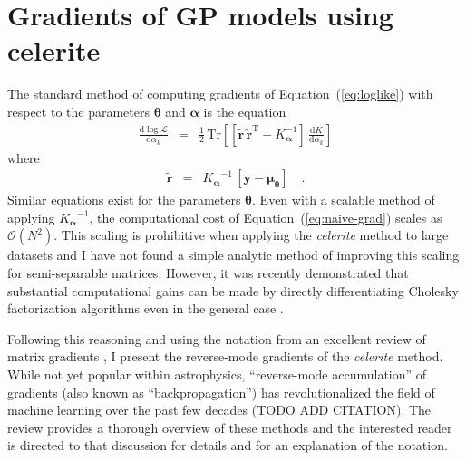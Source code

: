\documentclass[rnaas]{aastex62}
\renewcommand{\eqref}[1]{\ref{eq:#1}}
\newcommand{\Eq}[1]{Equation~(\eqref{#1})}
\newcommand{\eqlabel}[1]{\label{eq:#1}}
\newcommand{\T}{\ensuremath{\mathrm{T}}}
\newcommand{\dd}{\ensuremath{ \mathrm{d}}}
\newcommand{\bvec}[1]{{\ensuremath{\boldsymbol{#1}}}}
\begin{document}
\section{Gradients of GP models using celerite}

The standard method of computing gradients of \Eq{loglike} with respect to the
parameters $\bvec{\theta}$ and $\bvec{\alpha}$ is the equation
\citep{Rasmussen:2006}
\begin{eqnarray}\eqlabel{naive-grad}
\frac{\dd \log \mathcal{L}}{\dd \alpha_k} &=&
    \frac{1}{2}\,\mathrm{Tr}\left[
        \left[
        \bvec{\tilde{r}}\,\bvec{\tilde{r}}^\T - {K_\bvec{\alpha}^{-1}}
        \right]
        \,\frac{\dd K}{\dd \alpha_k}
    \right]
\end{eqnarray}
where
\begin{eqnarray}
    \bvec{\tilde{r}} &=&
        {K_\bvec{\alpha}}^{-1}\,\left[\bvec{y}-\bvec{\mu}_\bvec{\theta}\right]
    \quad.
\end{eqnarray}
Similar equations exist for the parameters $\bvec{\theta}$.
Even with a scalable method of applying ${K_\bvec{\alpha}}^{-1}$, the
computational cost of \Eq{naive-grad} scales as $\mathcal{O}(N^2)$.
This scaling is prohibitive when applying the \emph{celerite} method to large
datasets and I have not found a simple analytic method of improving this
scaling for semi-separable matrices.
However, it was recently demonstrated that substantial computational gains can
be made by directly differentiating Cholesky factorization algorithms even in
the general case \citep{Murray:2016}.

Following this reasoning and using the notation from an excellent review of
matrix gradients \citep{Giles:2008}, I present the reverse-mode gradients of
the \emph{celerite} method.
While not yet popular within astrophysics, ``reverse-mode accumulation'' of
gradients (also known as ``backpropagation'') has revolutionalized the field
of machine learning over the past few decades (TODO ADD CITATION).
The review \citep{Giles:2008} provides a thorough overview of these methods
and the interested reader is directed to that discussion for details and for
an explanation of the notation.
\end{document}
